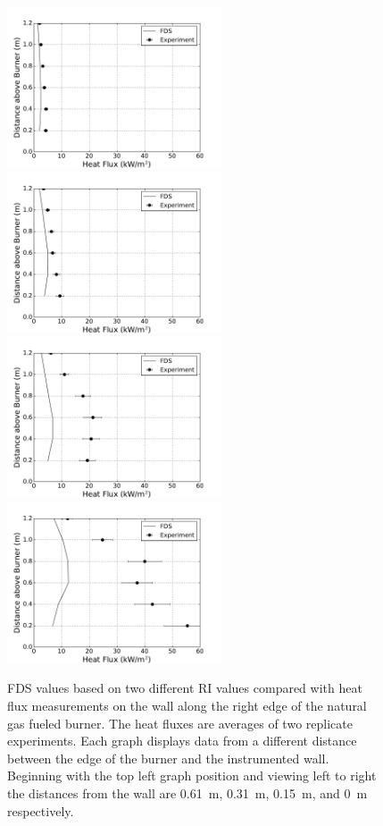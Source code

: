 \documentclass[twoside]{uocthesis}
\begin{document}
{\begin{figure}[ht!]
  \centering
  \includegraphics[width=2.5in]{../Figures/IWGB_NG_HF_Offset_Avg_2D}
  \includegraphics[width=2.5in]{../Figures/IWGB_NG_HF_Offset_Avg_1D}\\
  \includegraphics[width=2.5in]{../Figures/IWGB_NG_HF_Offset_Avg_0p5D}
  \includegraphics[width=2.5in]{../Figures/IWGB_NG_HF_Offset_Avg_0D}\\
  \caption[FDS values based on two different RI values compared with heat flux measurements on the wall along the right edge of the natural gas fueled burner]{FDS values based on two different RI values compared with heat flux measurements on the wall along the right edge of the natural gas fueled burner. The heat fluxes are averages of two replicate experiments. Each graph displays data from a different distance between the edge of the burner and the instrumented wall.  Beginning with the top left graph position and viewing left to right the distances from the wall are 0.61~m, 0.31~m, 0.15~m, and 0~m respectively.}
  \label{FDS_HFEdge_IWNG_comp}
\end{figure}


}
\end{document}

